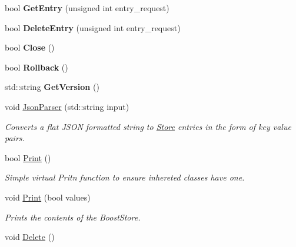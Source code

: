 \begin{DoxyCompactItemize}
\item 
\hypertarget{classBStore_a97fcf8d4fa8ba53f941fa5517648e9f1}{bool {\bfseries Get\-Entry} (unsigned int entry\-\_\-request)}\label{classBStore_a97fcf8d4fa8ba53f941fa5517648e9f1}

\item 
\hypertarget{classBStore_a48560f0a70b592c4e4d8ee4ecf0398c0}{bool {\bfseries Delete\-Entry} (unsigned int entry\-\_\-request)}\label{classBStore_a48560f0a70b592c4e4d8ee4ecf0398c0}

\item 
\hypertarget{classBStore_a6602870500ce8910363d62653080a289}{bool {\bfseries Close} ()}\label{classBStore_a6602870500ce8910363d62653080a289}

\item 
\hypertarget{classBStore_aba95222471cf63e0fced4c58a2e69b1c}{bool {\bfseries Rollback} ()}\label{classBStore_aba95222471cf63e0fced4c58a2e69b1c}

\item 
\hypertarget{classBStore_a3430187892c3c898f1f96348371340a7}{std\-::string {\bfseries Get\-Version} ()}\label{classBStore_a3430187892c3c898f1f96348371340a7}

\item 
void \hyperlink{classBStore_a0fe95a798f8bd5cda4e96bd8ffabb55e}{Json\-Parser} (std\-::string input)
\begin{DoxyCompactList}\small\item\em Converts a flat J\-S\-O\-N formatted string to \hyperlink{classStore}{Store} entries in the form of key value pairs. \end{DoxyCompactList}\item 
\hypertarget{classBStore_afa4b96dbaed11ab909a79465c630e131}{bool \hyperlink{classBStore_afa4b96dbaed11ab909a79465c630e131}{Print} ()}\label{classBStore_afa4b96dbaed11ab909a79465c630e131}

\begin{DoxyCompactList}\small\item\em Simple virtual Pritn function to ensure inhereted classes have one. \end{DoxyCompactList}\item 
void \hyperlink{classBStore_aefa280f87c1534b7685cfd7a1878333c}{Print} (bool values)
\begin{DoxyCompactList}\small\item\em Prints the contents of the Boost\-Store. \end{DoxyCompactList}\item 
\hypertarget{classBStore_a4fb9274504aeb81dd3f5feb87af26fb1}{void \hyperlink{classBStore_a4fb9274504aeb81dd3f5feb87af26fb1}{Delete} ()}\label{classBStore_a4fb9274504aeb81dd3f5feb87af26fb1}


\end{DoxyCompactItemize}
